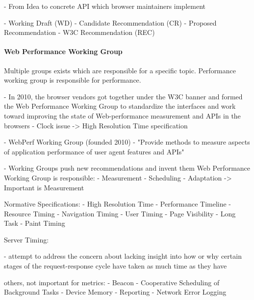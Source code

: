 - From Idea to concrete API which browser maintainers implement

- Working Draft (WD)
- Candidate Recommendation (CR)
- Proposed Recommendation
- W3C Recommendation (REC)





\paragraph{Web Performance Working Group}



Multiple groups exists which are responsible for a specific topic.
Performance working group is responsible for performance.

- In 2010, the browser vendors got together under the W3C banner and formed the Web Performance Working Group to standardize the interfaces and work toward improving the state of Web-performance measurement and APIs in the browsers
- Clock issue -> High Resolution Time specification

- WebPerf Working Group (founded 2010)
- "Provide methods to measure aspects of application performance of user agent features and APIs"

- Working Groups push new recommendations and invent them
Web Performance Working Group is responsible:
- Measurement
- Scheduling
- Adaptation
-> Important is Measurement





Normative Specifications:
- High Resolution Time
- Performance Timeline
- Resource Timing
- Navigation Timing
- User Timing
- Page Visibility
- Long Task
- Paint Timing


Server Timing:

- attempt to address the concern about lacking insight into how or why certain stages of the request-response cycle have taken as much time as they have


others, not important for metrics:
- Beacon
- Cooperative Scheduling of Background Tasks
- Device Memory
- Reporting
- Network Error Logging


